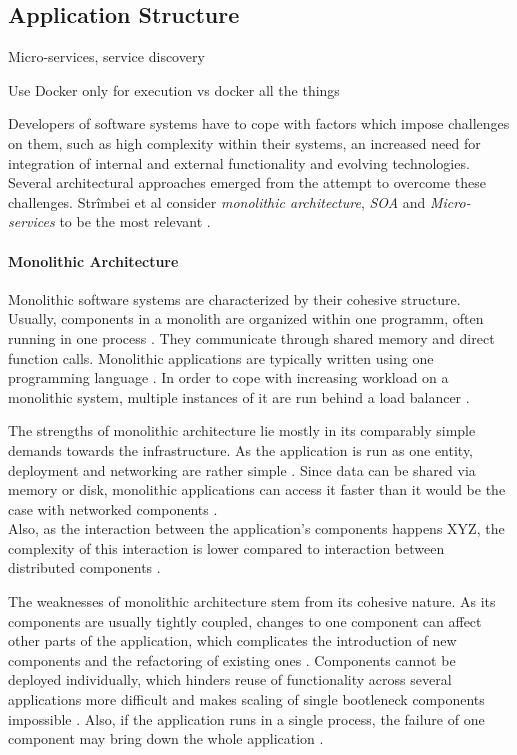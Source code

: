 

\subsection{Application Structure} %
  \label{sub:application_structure}
  Micro-services, service discovery \cite{Stubbs2015Distributed}

  Use Docker only for execution vs docker all the things

  Developers of software systems have to cope with factors which impose challenges on them, such as high complexity within their systems, an increased need for integration of internal and external functionality and evolving technologies. Several architectural approaches emerged from the attempt to overcome these challenges. Strîmbei et al consider \emph{monolithic architecture}, \emph{\ac{SOA}} and \emph{Micro-services} to be the most relevant \cite[p.~13]{Strimbei2015Software}.

  \paragraph{Monolithic Architecture} %
    \label{par:monolithic_architecture}
    Monolithic software systems are characterized by their cohesive structure. Usually, components in a monolith are organized within one programm, often running in one process \cite[p.~35]{Stubbs2015Distributed}. They communicate through shared memory and direct function calls. Monolithic applications are typically written using one programming language \cite[p.~14]{Strimbei2015Software}. In order to cope with increasing workload on a monolithic system, multiple instances of it are run behind a load balancer \cite[p.~35]{Stubbs2015Distributed}.

    The strengths of monolithic architecture lie mostly in its comparably simple demands towards the infrastructure. As the application is run as one entity, deployment and networking are rather simple \cite[p.~35]{Stubbs2015Distributed}. Since data can be shared via memory or disk, monolithic applications can access it faster than it would be the case with networked components \cite[p.~14]{Strimbei2015Software}. \\
    Also, as the interaction between the application's components happens XYZ, the complexity of this interaction is lower compared to interaction between distributed components \cite[p.~14]{Strimbei2015Software}.

    The weaknesses of monolithic architecture stem from its cohesive nature. As its components are usually tightly coupled, changes to one component can affect other parts of the application, which complicates the introduction of new components and the refactoring of existing ones \cite{Stubbs2015Distributed}.
    Components cannot be deployed individually, which hinders reuse of functionality across several applications more difficult and makes scaling of single bootleneck components impossible \cite{Stubbs2015Distributed}. Also, if the application runs in a single process, the failure of one component may bring down the whole application \cite[p.~5]{Newman2015Building}.

